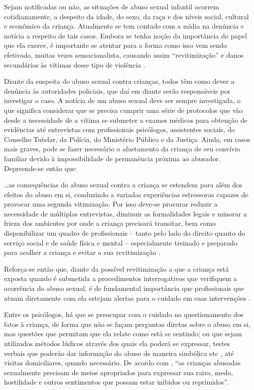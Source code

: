 Sejam notificadas ou não, as situações de abuso sexual infantil ocorrem cotidianamente, a despeito da idade, do sexo, da raça e dos níveis social, cultural e econômico da criança. Atualmente se tem contado com a mídia na denúncia e notícia a respeito de tais casos. Embora se tenha noção da importância do papel que ela exerce, é importante se atentar para a forma como isso vem sendo efetivado, muitas vezes sensacionalista, causando assim ``revitimização'' e danos secundários às vítimas desse tipo de violência \cite[p. 95]{KUNG2009}. 

Diante da suspeita do abuso sexual contra crianças, todos têm como dever a denúncia às autoridades policiais, que daí em diante serão responsáveis por investigar o caso. A notícia de um abuso sexual deve ser sempre investigada, o que significa considerar que se precisa cumprir uma série de protocolos que vão desde a necessidade de a vítima se submeter a exames médicos para obtenção de evidências até entrevistas com profissionais psicólogos, assistentes sociais, do Conselho Tutelar, da Polícia, do Ministério Público e da Justiça. Ainda, em casos mais graves, pode se fazer necessário o afastamento da criança de seu convívio familiar devido à impossibilidade de permanência próxima ao abusador. Depreende-se então que:

\begin{citacao}
	\ldots as consequências do abuso sexual contra a criança se estendem para além dos efeitos do abuso em si, conduzindo a variadas experiências estressoras capazes de provocar uma segunda vitimização. Por isso deve-se procurar reduzir a necessidade de múltiplas entrevistas, diminuir as formalidades legais e minorar a frieza dos ambientes por onde a criança precisará transitar, bem como disponibilizar um quadro de profissionais -- tanto pelo lado do direito quanto do serviço social e de saúde física e mental -- especialmente treinado e preparado para acolher a criança e evitar a sua revitimização \cite[p. 81]{TRINDADEBREIER2007}.
\end{citacao}

Reforça-se então que, diante da possível revitimização a que a criança está exposta quando é submetida a procedimentos interrogativos que verifiquem a ocorrência do abuso sexual, é de fundamental importância que profissionais que atuam diretamente com ela estejam alertas para o cuidado em suas intervenções .

Entre os psicólogos, há que se preocupar com o cuidado no questionamento dos fatos à criança, de forma que não se façam perguntas diretas sobre o abuso em si, mas questões que permitam que ela relate como está se sentindo; ou que sejam utilizados métodos lúdicos através dos quais ela poderá se expressar, testes verbais que poderão dar informação do abuso de maneira simbólica etc \cite{JUNG2006}, até visitas domiciliares, quando necessário. De acordo com , ``as crianças abusadas sexualmente precisam de meios apropriados para expressar sua raiva, medo, hostilidade e outros sentimentos que possam estar inibidos ou reprimidos''. 

